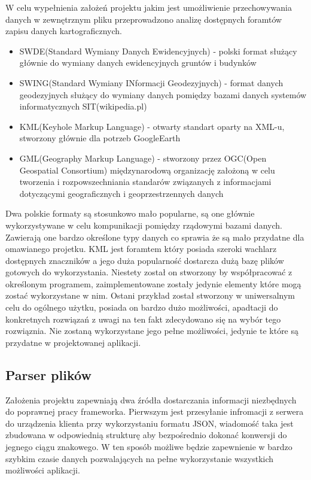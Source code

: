 W celu wypełnienia założeń projektu jakim jest umożliwienie przechowywania danych w zewnętrznym pliku przeprowadzono analizę dostępnych foramtów zapisu danych kartograficznych.

\begin{itemize}

\item
SWDE(Standard Wymiany Danych Ewidencyjnych) - polski format służący głównie do wymiany danych ewidencyjnych gruntów i budynków

\item
SWING(Standard Wymiany INformacji Geodezyjnych) - format danych geodezyjnych służący do wymiany danych pomiędzy bazami danych systemów informatycznych SIT(wikipedia.pl)

\item
KML(Keyhole Markup Language) - otwarty standart oparty na XML-u, stworzony głównie dla potrzeb GoogleEarth

\item
GML(Geography Markup Language) - stworzony przez OGC(Open Geospatial Consortium) międzynarodową organizację założoną w celu tworzenia i rozpowszechniania standarów związanych z informacjami dotyczącymi geograficznych i geoprzestrzennych danych

\end{itemize}

Dwa polskie formaty są stosunkowo mało popularne, są one głównie wykorzystywane w celu kompunikacji pomiędzy rządowymi bazami danych. Zawierają one bardzo określone typy danych co sprawia że są mało przydatne dla omawianego projetku. KML jest foramtem który posiada szeroki wachlarz dostępnych znaczników a jego duża popularność dostarcza dużą bazę plików gotowych do wykorzystania. Niestety został on stworzony by współpracować z określonym programem, zaimplementowane zostały jedynie elementy które mogą zostać wykorzystane w nim. Ostani przykład został stworzony w uniwersalnym celu do ogólnego użytku, posiada on bardzo dużo możliwości, apadtacji do konkretnych rozwiązań\cite{gml} z uwagi na ten fakt zdecydowano się na wybór tego rozwiąznia. Nie zostaną wykorzystane jego pełne możliwości, jedynie te które są przydatne w projektowanej aplikacji.


\subsection{Parser plików}
\label{subsec:parser}

Założenia projektu zapewniają dwa źródła dostarczania informacji niezbędnych do poprawnej pracy frameworka.
Pierwszym jest przesyłanie infromacji z serwera do urządzenia klienta przy wykorzystaniu formatu JSON, wiadomość taka jest zbudowana w odpowiednią strukturę aby bezpośrednio dokonać konwersji do jegnego ciągu znakowego. W ten sposób możliwe będzie zapewnienie w bardzo szybkim czasie danych pozwalających na pełne wykorzystanie wszystkich możliwości aplikacji.

